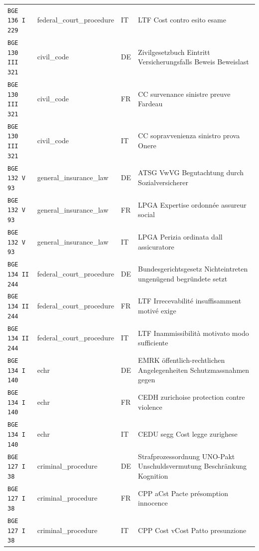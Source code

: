 \begin{table}[h]
\begin{tabular}{>{\raggedright\arraybackslash}p{2.2cm} >{\raggedright\arraybackslash}p{3.55cm} >{\raggedright\arraybackslash}p{0.8cm} >{\raggedright\arraybackslash}p{8.05cm}}
\texttt{BGE 136 I 229} & federal\_court\_procedure & IT & LTF Cost contro esito esame \\
\texttt{BGE 130 III 321} & civil\_code & DE & Zivilgesetzbuch Eintritt Versicherungsfalls Beweis Beweislast \\
\texttt{BGE 130 III 321} & civil\_code & FR & CC survenance sinistre preuve Fardeau \\
\texttt{BGE 130 III 321} & civil\_code & IT & CC sopravvenienza sinistro prova Onere \\
\texttt{BGE 132 V 93} & general\_insurance\_law & DE & ATSG VwVG Begutachtung durch Sozialversicherer \\
\texttt{BGE 132 V 93} & general\_insurance\_law & FR & LPGA Expertise ordonnée assureur social \\
\texttt{BGE 132 V 93} & general\_insurance\_law & IT & LPGA Perizia ordinata dall assicuratore \\
\texttt{BGE 134 II 244} & federal\_court\_procedure & DE & Bundesgerichtsgesetz Nichteintreten ungenügend begründete setzt \\
\texttt{BGE 134 II 244} & federal\_court\_procedure & FR & LTF Irrecevabilité insuffisamment motivé exige \\
\texttt{BGE 134 II 244} & federal\_court\_procedure & IT & LTF Inammissibilità motivato modo sufficiente \\
\texttt{BGE 134 I 140} & echr & DE & EMRK öffentlich-rechtlichen Angelegenheiten Schutzmassnahmen gegen \\
\texttt{BGE 134 I 140} & echr & FR & CEDH zurichoise protection contre violence \\
\texttt{BGE 134 I 140} & echr & IT & CEDU segg Cost legge zurighese \\
\texttt{BGE 127 I 38} & criminal\_procedure & DE & Strafprozessordnung UNO-Pakt Unschuldsvermutung Beschränkung Kognition \\
\texttt{BGE 127 I 38} & criminal\_procedure & FR & CPP aCst Pacte présomption innocence \\
\texttt{BGE 127 I 38} & criminal\_procedure & IT & CPP Cost vCost Patto presunzione \\
\bottomrule
\end{tabular}
\end{table}
\clearpage
